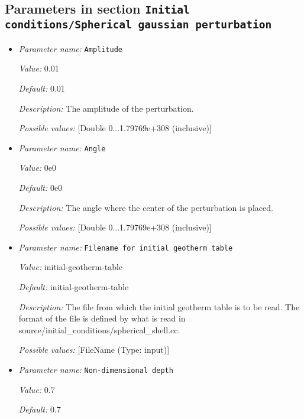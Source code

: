 \subsection{Parameters in section \tt Initial conditions/Spherical gaussian perturbation}
\label{parameters:Initial_20conditions/Spherical_20gaussian_20perturbation}

\begin{itemize}
\item {\it Parameter name:} {\tt Amplitude}


{\it Value:} 0.01


{\it Default:} 0.01


{\it Description:} The amplitude of the perturbation.


{\it Possible values:} [Double 0...1.79769e+308 (inclusive)]
\item {\it Parameter name:} {\tt Angle}


{\it Value:} 0e0


{\it Default:} 0e0


{\it Description:} The angle where the center of the perturbation is placed.


{\it Possible values:} [Double 0...1.79769e+308 (inclusive)]
\item {\it Parameter name:} {\tt Filename for initial geotherm table}


{\it Value:} initial-geotherm-table


{\it Default:} initial-geotherm-table


{\it Description:} The file from which the initial geotherm table is to be read. The format of the file is defined by what is read in source/initial\_conditions/spherical\_shell.cc.


{\it Possible values:} [FileName (Type: input)]
\item {\it Parameter name:} {\tt Non-dimensional depth}


{\it Value:} 0.7


{\it Default:} 0.7



\end{itemize}

